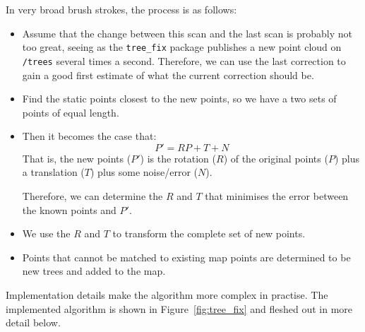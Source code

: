 \documentclass[12pt,oneside,a4paper]{book}
\begin{document}
In very broad brush strokes, the process is as follows:
\begin{itemize}
\item Assume that the change between this scan and the last scan is
  probably not too great, seeing as the \texttt{tree\_fix} package
  publishes a new point cloud on \texttt{/trees} several times a
  second. Therefore, we can use the last correction to gain a good
  first estimate of what the current correction should be.
\item Find the static points closest to the new points, so we have a
  two sets of points of equal length. 
\item Then it becomes the case that:
  \begin{equation}
    \label{eq:1}
    P' = RP + T + N
  \end{equation}
  That is, the new points ($P'$) is the rotation ($R$) of the original
  points ($P$) plus a translation ($T$) plus some noise/error ($N$).

  Therefore, we can determine the $R$ and $T$ that minimises the error
  between the known points and $P'$.
\item We use the $R$ and $T$ to transform the complete set of new
  points. 
\item Points that cannot be matched to existing map points are
  determined to be new trees and added to the map.
\end{itemize}

Implementation details make the algorithm more complex in
practise. The implemented algorithm is shown in
Figure~\ref{fig:tree_fix} and fleshed out in more detail below.
\end{document}
